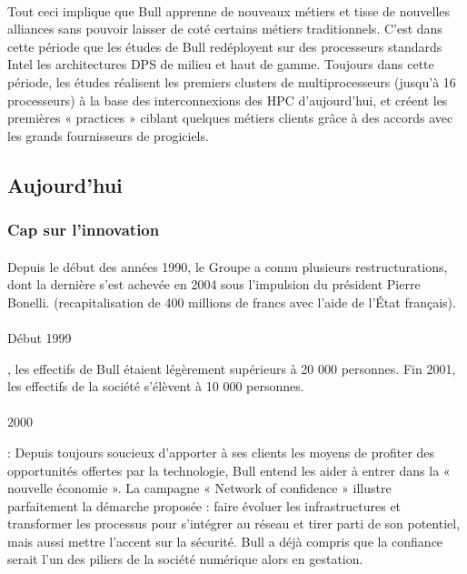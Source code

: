\documentclass[11pt]{article}
\begin{document}
		\paragraph{}
		Tout ceci implique que Bull apprenne de nouveaux métiers et tisse de nouvelles alliances sans pouvoir laisser de coté 
		certains métiers traditionnels. C’est dans cette période que les études de Bull redéployent sur des processeurs 
		standards Intel les architectures DPS de milieu et haut de gamme. Toujours dans cette période, les études réalisent 
		les premiers clusters de multiprocesseurs (jusqu’à 16 processeurs) à la base des interconnexions des HPC d’aujourd’hui, 
		et créent les premières « practices » ciblant quelques métiers clients grâce à des accords avec les grands fournisseurs 
		de progiciels. 
		\subsection{Aujourd'hui}
		\subsubsection{Cap sur l'innovation}
		\paragraph{}
		Depuis le début des années 1990, le Groupe a connu plusieurs restructurations, dont la dernière s'est achevée en 2004 
		sous l’impulsion du président Pierre Bonelli. (recapitalisation de 400 millions de francs avec l'aide de l'État français).
		\paragraph{}
		\begin{bf}Début 1999\end{bf}, les effectifs de Bull étaient légèrement supérieurs à 20 000 personnes. Fin 2001, 
		les effectifs de la société s’élèvent à 10 000 personnes.
		\paragraph{}
		\begin{bf}2000\end{bf} : Depuis toujours soucieux d’apporter à ses clients les moyens de profiter des opportunités 
		offertes par la technologie, Bull entend les aider à entrer dans la « nouvelle économie ». La campagne 
		« Network of confidence » illustre parfaitement la démarche proposée : faire évoluer les infrastructures et transformer 
		les processus pour s’intégrer au réseau et tirer parti de son potentiel, mais aussi mettre l’accent sur la sécurité. 
		Bull a déjà compris que la confiance serait l’un des piliers de la société numérique alors en gestation.
\end{document}
